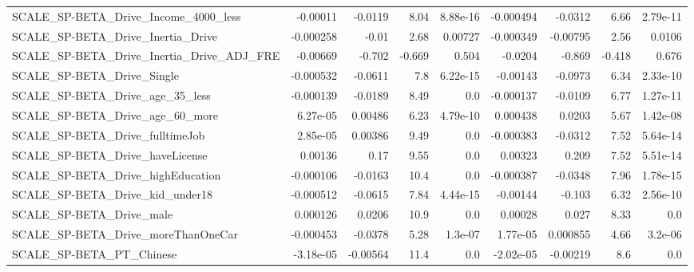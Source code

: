 \begin{tabular}{lrrrrrrrr}
SCALE\_SP-BETA\_Drive\_Income\_4000\_less               &    -0.00011 &      -0.0119 &     8.04 & 8.88e-16 &  -0.000494 &     -0.0312 &         6.66 &      2.79e-11 \\
SCALE\_SP-BETA\_Drive\_Inertia\_Drive                  &   -0.000258 &        -0.01 &     2.68 &  0.00727 &  -0.000349 &    -0.00795 &         2.56 &        0.0106 \\
SCALE\_SP-BETA\_Drive\_Inertia\_Drive\_ADJ\_FRE          &    -0.00669 &       -0.702 &   -0.669 &    0.504 &    -0.0204 &      -0.869 &       -0.418 &         0.676 \\
SCALE\_SP-BETA\_Drive\_Single                         &   -0.000532 &      -0.0611 &      7.8 & 6.22e-15 &   -0.00143 &     -0.0973 &         6.34 &      2.33e-10 \\
SCALE\_SP-BETA\_Drive\_age\_35\_less                    &   -0.000139 &      -0.0189 &     8.49 &      0.0 &  -0.000137 &     -0.0109 &         6.77 &      1.27e-11 \\
SCALE\_SP-BETA\_Drive\_age\_60\_more                    &    6.27e-05 &      0.00486 &     6.23 & 4.79e-10 &   0.000438 &      0.0203 &         5.67 &      1.42e-08 \\
SCALE\_SP-BETA\_Drive\_fulltimeJob                    &    2.85e-05 &      0.00386 &     9.49 &      0.0 &  -0.000383 &     -0.0312 &         7.52 &      5.64e-14 \\
SCALE\_SP-BETA\_Drive\_haveLicense                    &     0.00136 &         0.17 &     9.55 &      0.0 &    0.00323 &       0.209 &         7.52 &      5.51e-14 \\
SCALE\_SP-BETA\_Drive\_highEducation                  &   -0.000106 &      -0.0163 &     10.4 &      0.0 &  -0.000387 &     -0.0348 &         7.96 &      1.78e-15 \\
SCALE\_SP-BETA\_Drive\_kid\_under18                    &   -0.000512 &      -0.0615 &     7.84 & 4.44e-15 &   -0.00144 &      -0.103 &         6.32 &      2.56e-10 \\
SCALE\_SP-BETA\_Drive\_male                           &    0.000126 &       0.0206 &     10.9 &      0.0 &    0.00028 &       0.027 &         8.33 &           0.0 \\
SCALE\_SP-BETA\_Drive\_moreThanOneCar                 &   -0.000453 &      -0.0378 &     5.28 &  1.3e-07 &   1.77e-05 &    0.000855 &         4.66 &       3.2e-06 \\
SCALE\_SP-BETA\_PT\_Chinese                           &   -3.18e-05 &     -0.00564 &     11.4 &      0.0 &  -2.02e-05 &    -0.00219 &          8.6 &           0.0 \\

\end{tabular}
